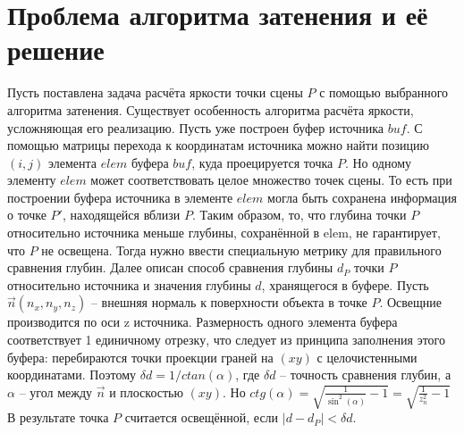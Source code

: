 \section{Проблема алгоритма затенения и её решение} {
    Пусть поставлена задача расчёта яркости точки сцены $P$ с помощью
    выбранного алгоритма затенения.
    Существует особенность алгоритма расчёта яркости, усложняющая
    его реализацию.
    Пусть уже построен буфер источника $buf$.
    С помощью матрицы перехода к координатам источника можно найти позицию
    $(i, j)$ элемента $elem$ буфера $buf$, куда проецируется точка $P$.
    Но одному элементу $elem$ может соответствовать целое множество
    точек сцены.
    То есть при построении буфера источника в элементе $elem$ могла быть
    сохранена информация о точке $P'$, находящейся вблизи $P$.
    Таким образом, то, что глубина точки $P$ относительно источника
    меньше глубины, сохранённой в elem, не гарантирует, что $P$ не освещена.
    Тогда нужно ввести специальную метрику для правильного сравнения глубин.
    Далее описан способ сравнения глубины $d_P$ точки $P$ относительно
    источника и значения глубины $d$, хранящегося в буфере.
    Пусть $\vec{n}(n_x, n_y, n_z)$ -- внешняя нормаль к поверхности объекта
    в точке $P$.
    Освещние производится по оси z источника.
    Размерность одного элемента буфера соответствует 1 единичному отрезку,
    что следует из принципа заполнения этого буфера: перебираются точки
    проекции граней на $(xy)$ с целочистенными координатами.
    Поэтому $\delta d = 1 / ctan(\alpha)$,
    где $\delta d$ -- точность сравнения глубин, а $\alpha$ --
    угол между $\vec{n}$ и плоскостью $(xy)$.
    Но $ctg(\alpha) = \sqrt{\frac{1}{\sin^2(\alpha)} - 1} =
    \sqrt{\frac{1}{z_n^2} - 1}$
    В результате точка $P$ считается освещённой,
    если $|d - d_P| < \delta d$.
}